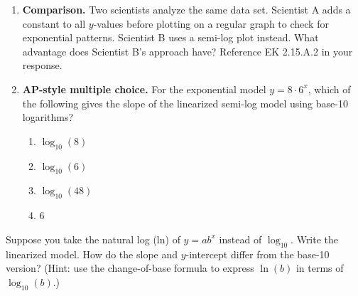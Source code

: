 \documentclass[10pt]{article}
\begin{document}
\begin{enumerate}[leftmargin=1.8em, itemsep=14pt]
\begin{enumerate}[leftmargin=1.5em, itemsep=6pt, label=\alph*.]
  \item Complete the $\log_{10}(P)$ row (round to three decimal places).
  \item Find the slope of $\log_{10}(P)$ vs.\ $t$ using any two consecutive points.
        \quad Slope $= $ \blank{4cm}
  \item Find $b = 10^{\text{slope}} \approx $ \blank{2.5cm} and $a = 10^{\log_{10}(P_0)} \approx $ \blank{2.5cm}.
  \item Write the exponential model: $P(t) = $ \blank{5cm}
  \item Verify: $P(2) = $ \blank{4cm}. Does this match the table? \blank{1.5cm}
\end{enumerate}

\item \textbf{Comparison.}  Two scientists analyze the same data set.  Scientist A adds a
      constant to all $y$-values before plotting on a regular graph to check for exponential
      patterns.  Scientist B uses a semi-log plot instead.  What advantage does Scientist B's
      approach have?  Reference EK 2.15.A.2 in your response.


\item \textbf{AP-style multiple choice.}  For the exponential model $y = 8 \cdot 6^x$,
      which of the following gives the slope of the linearized semi-log model using
      base-10 logarithms?

\vspace{6pt}
\begin{enumerate}[leftmargin=2em, itemsep=4pt, label=(\Alph*)]
  \item $\log_{10}(8)$
  \item $\log_{10}(6)$
  \item $\log_{10}(48)$
  \item $6$
\end{enumerate}

\end{enumerate}

\vspace{0.1in}

\begin{tcolorbox}[colback=goldbg, colframe=goldacc, arc=2mm, left=3mm, right=3mm,
    top=2mm, bottom=2mm, title=\textbf{Extension}, fonttitle=\bfseries]
Suppose you take the natural log (ln) of $y = ab^x$ instead of $\log_{10}$.  Write the
linearized model.  How do the slope and $y$-intercept differ from the base-10 version?
(Hint: use the change-of-base formula to express $\ln(b)$ in terms of $\log_{10}(b)$.)

\end{tcolorbox}
\end{document}
